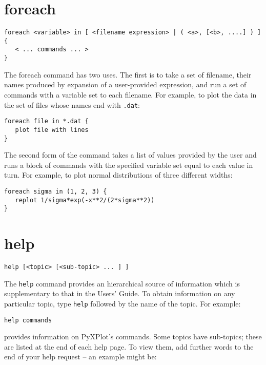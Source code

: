 \section{foreach}

\begin{verbatim}
foreach <variable> in [ <filename expression> | ( <a>, [<b>, ....] ) ] {
   < ... commands ... >
}
\end{verbatim}

The foreach command has two uses.  The first is to take a set of filename, their
names produced by expansion of a user-provided expression, and run a set of
commands with a variable set to each filename.  For example, to plot the data in
the set of files whose names end with {\tt .dat}:

\begin{verbatim}
foreach file in *.dat {
   plot file with lines
}
\end{verbatim}

The second form of the command takes a list of values provided by the user and
runs a block of commands with the specified variable set equal to each value in
turn.  For example, to plot normal distributions of three different widths:

\begin{verbatim}
foreach sigma in (1, 2, 3) {
   replot 1/sigma*exp(-x**2/(2*sigma**2))
}
\end{verbatim}


\section{help}

\begin{verbatim}
help [<topic> [<sub-topic> ... ] ]
\end{verbatim}

The {\tt help} command provides an hierarchical source of information which
is supplementary to that in the Users' Guide.  To obtain information on any
particular topic, type {\tt help} followed by the name of the topic. For
example:

\begin{verbatim}
help commands
\end{verbatim}

\noindent provides information on PyXPlot's commands. Some topics have
sub-topics; these are listed at the end of each help page. To view them, add
further words to the end of your help request -- an example might be:

